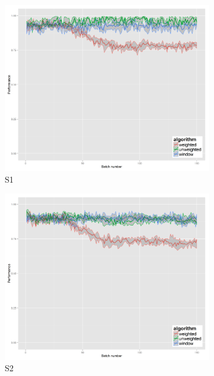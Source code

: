\begin{figure}[H]
\begin{subfigure}{.45\textwidth}
  \centering
  \includegraphics[width=.9\linewidth]{s_set/s_set_1_ci_one_size_purity.png}
  \caption{S1}
\end{subfigure}%
\begin{subfigure}{.45\textwidth}
  \centering
  \includegraphics[width=.9\linewidth]{s_set/s_set_2_ci_one_size_purity.png}
  \caption{S2}
\end{subfigure}
\begin{subfigure}{.45\textwidth}
  \centering

\end{subfigure}
\end{figure}
